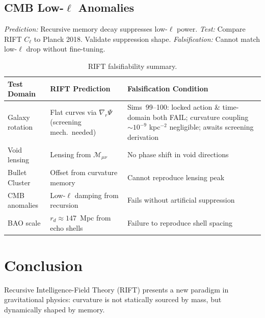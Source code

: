 \documentclass[12pt,a4paper]{article}
\begin{document}
\subsection{CMB Low-\texorpdfstring{$\ell$}{ell} Anomalies}
\emph{Prediction:} Recursive memory decay suppresses low-$\ell$ power.
\emph{Test:} Compare RIFT $C_\ell$ to Planck 2018. Validate suppression shape.
\emph{Falsification:} Cannot match low-$\ell$ drop without fine-tuning.

\begin{table}[ht]
\centering
\caption{RIFT falsifiability summary.}
\begin{tabular}{lll}
\toprule
Test Domain & RIFT Prediction & Falsification Condition \\
\midrule
Galaxy rotation & Flat curves via $\nabla_r\Psi$ (screening mech.\ needed) & Sims~99--100: locked action \& time-domain both FAIL; curvature coupling $\sim10^{-9}$ kpc$^{-2}$ negligible; awaits screening derivation \\
Void lensing & Lensing from $\mathcal{M}_{\mu\nu}$ & No phase shift in void directions \\
Bullet Cluster & Offset from curvature memory & Cannot reproduce lensing peak \\
CMB anomalies & Low-$\ell$ damping from recursion & Fails without artificial suppression \\
BAO scale & $r_d \approx 147$~Mpc from echo shells & Failure to reproduce shell spacing \\
\bottomrule
\end{tabular}
\end{table}

\section{Conclusion}
\label{sec:conclusion}

Recursive Intelligence-Field Theory (RIFT) presents a new paradigm in gravitational
physics: curvature is not statically sourced by mass, but dynamically shaped by memory.
\end{document}
